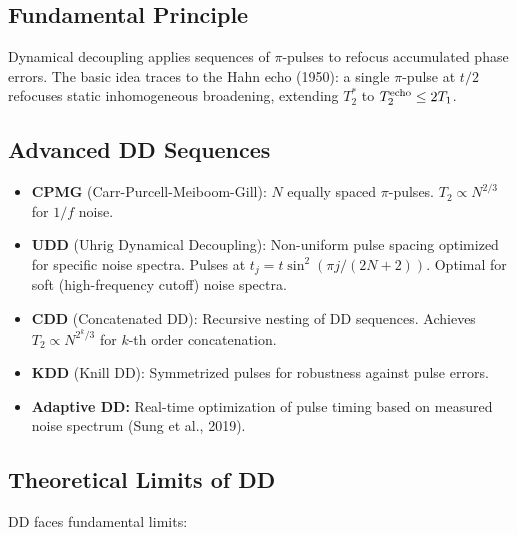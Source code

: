 \documentclass[11pt,letterpaper]{article}
\begin{document}
\subsection{Fundamental Principle}

Dynamical decoupling applies sequences of $\pi$-pulses to refocus
accumulated phase errors. The basic idea traces to the Hahn echo (1950):
a single $\pi$-pulse at $t/2$ refocuses static inhomogeneous broadening,
extending $T_2^*$ to $T_2^{\rm echo} \leq 2T_1$.

\subsection{Advanced DD Sequences}

\begin{itemize}
\item \textbf{CPMG} (Carr-Purcell-Meiboom-Gill): $N$ equally spaced
$\pi$-pulses. $T_2 \propto N^{2/3}$ for $1/f$ noise.
\item \textbf{UDD} (Uhrig Dynamical Decoupling): Non-uniform pulse
spacing optimized for specific noise spectra. Pulses at
$t_j = t\sin^2(\pi j/(2N+2))$. Optimal for soft (high-frequency
cutoff) noise spectra.
\item \textbf{CDD} (Concatenated DD): Recursive nesting of DD sequences.
Achieves $T_2 \propto N^{2^k/3}$ for $k$-th order concatenation.
\item \textbf{KDD} (Knill DD): Symmetrized pulses for robustness against
pulse errors.
\item \textbf{Adaptive DD:} Real-time optimization of pulse timing based
on measured noise spectrum (Sung et al., 2019).
\end{itemize}

\subsection{Theoretical Limits of DD}

DD faces fundamental limits:
\end{document}
